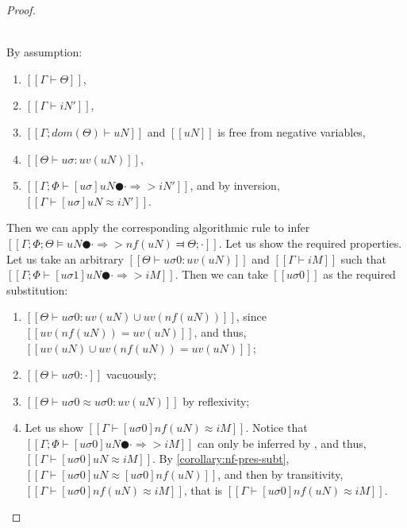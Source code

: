 \begin{proof}
\begin{caseof}
        \item {}\\
            By assumption: 
            \begin{enumerate}
                \item $[[Γ ⊢ Θ]]$,
                \item $[[Γ ⊢ iN']]$,
                \item $[[Γ; dom(Θ) ⊢ uN]]$ and $[[uN]]$ is free from negative variables,
                \item $[[Θ ⊢ uσ : uv(uN)]]$,
                \item $[[Γ; Φ ⊢ [uσ]uN ● · ⇒> iN' ]]$,
                    and by inversion, $[[Γ ⊢ [uσ]uN ≈ iN']]$.
            \end{enumerate}


            Then we can apply the corresponding algorithmic rule
             to infer
            $[[ Γ; Φ; Θ ⊨ uN ● · ⇒> nf(uN) ⫤ Θ; · ]]$.
            Let us show the required properties. 
            Let us take an arbitrary 
            $[[Θ ⊢ uσ0 : uv(uN)]]$ and $[[Γ ⊢ iM]]$
            such that $[[Γ; Φ ⊢ [uσ1]uN ● · ⇒> iM]]$. 
            Then we can take $[[uσ0]]$ as the required substitution:
            \begin{enumerate}
                \item $[[ Θ ⊢ uσ0 : uv(uN) ∪ uv(nf(uN)) ]]$,
                    since $[[uv(nf(uN)) = uv(uN)]]$, 
                    and thus, $[[uv(uN) ∪ uv(nf(uN)) = uv(uN)]]$;
                \item $[[ Θ ⊢ uσ0 : · ]]$ vacuously;
                \item $[[Θ ⊢ uσ0 ≈ uσ0 : uv(uN)]]$ by reflexivity;
                \item Let us show $[[Γ ⊢ [uσ0]nf(uN) ≈ iM]]$.
                    Notice that $[[Γ; Φ ⊢ [uσ0]uN ● · ⇒> iM]]$ can only be inferred by 
                    , and thus, $[[ Γ ⊢ [uσ0]uN ≈ iM ]]$.
                    By \cref{corollary:nf-pres-subt},
                    $[[Γ ⊢ [uσ0]uN ≈ [uσ0]nf(uN)]]$,
                    and then by transitivity, $[[Γ ⊢ [uσ0]nf(uN) ≈ iM]]$,
                    that is $[[Γ ⊢ [uσ0]nf(uN) ≈ iM]]$.
            \end{enumerate}
    \end{caseof}
\end{proof}
